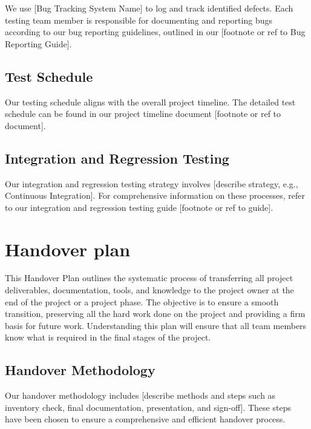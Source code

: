 \documentclass[10pt]{projectdoc}
\begin{document}
We use [Bug Tracking System Name] to log and track identified defects. Each testing team member is responsible for documenting and reporting bugs according to our bug reporting guidelines, outlined in our [footnote or ref to Bug Reporting Guide].

\subsection{Test Schedule}

Our testing schedule aligns with the overall project timeline. The detailed test schedule can be found in our project timeline document [footnote or ref to document].

\subsection{Integration and Regression Testing}

Our integration and regression testing strategy involves [describe strategy, e.g., Continuous Integration]. For comprehensive information on these processes, refer to our integration and regression testing guide [footnote or ref to guide].

\newpage
\section{Handover plan}

\noindent This Handover Plan outlines the systematic process of transferring all project deliverables, documentation, tools, and knowledge to the project owner at the end of the project or a project phase. The objective is to ensure a smooth transition, preserving all the hard work done on the project and providing a firm basis for future work. Understanding this plan will ensure that all team members know what is required in the final stages of the project.

\subsection{Handover Methodology}

Our handover methodology includes [describe methods and steps such as inventory check, final documentation, presentation, and sign-off]. These steps have been chosen to ensure a comprehensive and efficient handover process.
\end{document}

